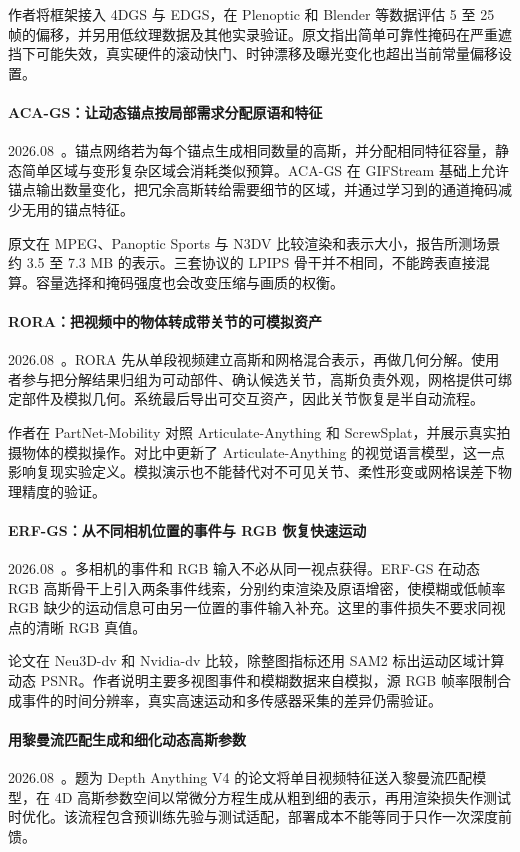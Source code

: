 作者将框架接入 4DGS 与 EDGS，在 Plenoptic 和 Blender 等数据评估 5 至 25 帧的偏移，并另用低纹理数据及其他实录验证。原文指出简单可靠性掩码在严重遮挡下可能失效，真实硬件的滚动快门、时钟漂移及曝光变化也超出当前常量偏移设置。

\paragraph{ACA-GS：让动态锚点按局部需求分配原语和特征}
2026.08~\cite{2608_04581}。锚点网络若为每个锚点生成相同数量的高斯，并分配相同特征容量，静态简单区域与变形复杂区域会消耗类似预算。ACA-GS 在 GIFStream 基础上允许锚点输出数量变化，把冗余高斯转给需要细节的区域，并通过学习到的通道掩码减少无用的锚点特征。

原文在 MPEG、Panoptic Sports 与 N3DV 比较渲染和表示大小，报告所测场景约 3.5 至 7.3 MB 的表示。三套协议的 LPIPS 骨干并不相同，不能跨表直接混算。容量选择和掩码强度也会改变压缩与画质的权衡。

\paragraph{RORA：把视频中的物体转成带关节的可模拟资产}
2026.08~\cite{2608_04842}。RORA 先从单段视频建立高斯和网格混合表示，再做几何分解。使用者参与把分解结果归组为可动部件、确认候选关节，高斯负责外观，网格提供可绑定部件及模拟几何。系统最后导出可交互资产，因此关节恢复是半自动流程。

作者在 PartNet-Mobility 对照 Articulate-Anything 和 ScrewSplat，并展示真实拍摄物体的模拟操作。对比中更新了 Articulate-Anything 的视觉语言模型，这一点影响复现实验定义。模拟演示也不能替代对不可见关节、柔性形变或网格误差下物理精度的验证。

\paragraph{ERF-GS：从不同相机位置的事件与 RGB 恢复快速运动}
2026.08~\cite{2608_08531}。多相机的事件和 RGB 输入不必从同一视点获得。ERF-GS 在动态 RGB 高斯骨干上引入两条事件线索，分别约束渲染及原语增密，使模糊或低帧率 RGB 缺少的运动信息可由另一位置的事件输入补充。这里的事件损失不要求同视点的清晰 RGB 真值。

论文在 Neu3D-dv 和 Nvidia-dv 比较，除整图指标还用 SAM2 标出运动区域计算动态 PSNR。作者说明主要多视图事件和模糊数据来自模拟，源 RGB 帧率限制合成事件的时间分辨率，真实高速运动和多传感器采集的差异仍需验证。

\paragraph{用黎曼流匹配生成和细化动态高斯参数}
2026.08~\cite{2608_18388}。题为 Depth Anything V4 的论文将单目视频特征送入黎曼流匹配模型，在 4D 高斯参数空间以常微分方程生成从粗到细的表示，再用渲染损失作测试时优化。该流程包含预训练先验与测试适配，部署成本不能等同于只作一次深度前馈。

